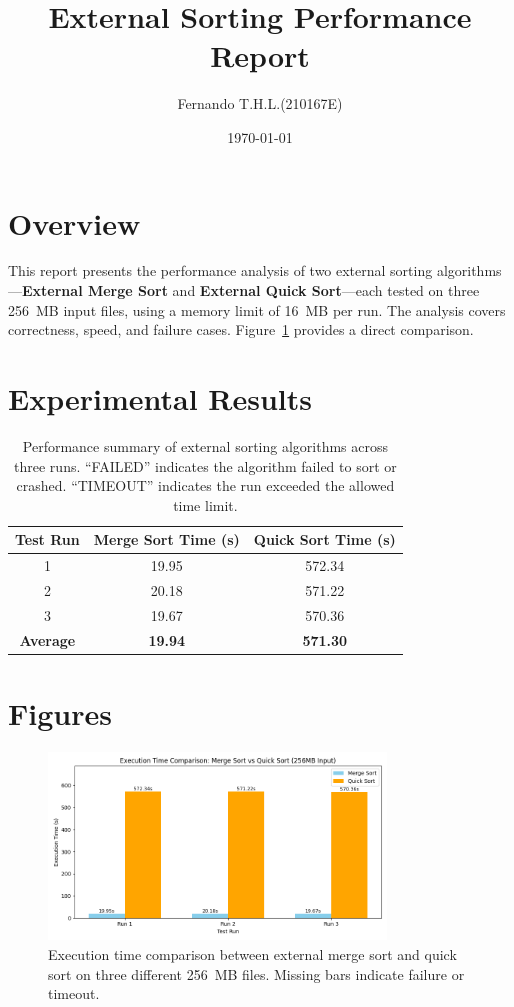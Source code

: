 \documentclass{article}
\title{External Sorting Performance Report}
\author{Fernando T.H.L.(210167E)}
\date{\today}
\begin{document}
\maketitle

\section*{Overview}
This report presents the performance analysis of two external sorting algorithms---\textbf{External Merge Sort} and \textbf{External Quick Sort}---each tested on three 256~MB input files, using a memory limit of 16~MB per run. The analysis covers correctness, speed, and failure cases. Figure~\ref{fig:sort_times_comparison} provides a direct comparison.

\section*{Experimental Results}
\begin{table}[h!]
\centering
\begin{tabular}{c c c}
\toprule
Test Run & Merge Sort Time (s) & Quick Sort Time (s) \\
\midrule
1 & 19.95 & 572.34 \\
2 & 20.18 & 571.22 \\
3 & 19.67 & 570.36 \\
\midrule
\textbf{Average} & \textbf{19.94} & \textbf{571.30} \\
\bottomrule
\end{tabular}
\caption{Performance summary of external sorting algorithms across three runs. ``FAILED'' indicates the algorithm failed to sort or crashed. ``TIMEOUT'' indicates the run exceeded the allowed time limit.}
\label{tab:perf_summary}
\end{table}

\section*{Figures}
\begin{figure}[h!]
\centering
\includegraphics[width=0.8\textwidth]{figures/sort_times_comparison.png}
\caption{Execution time comparison between external merge sort and quick sort on three different 256~MB files. Missing bars indicate failure or timeout.}
\label{fig:sort_times_comparison}
\end{figure}
\end{document}
